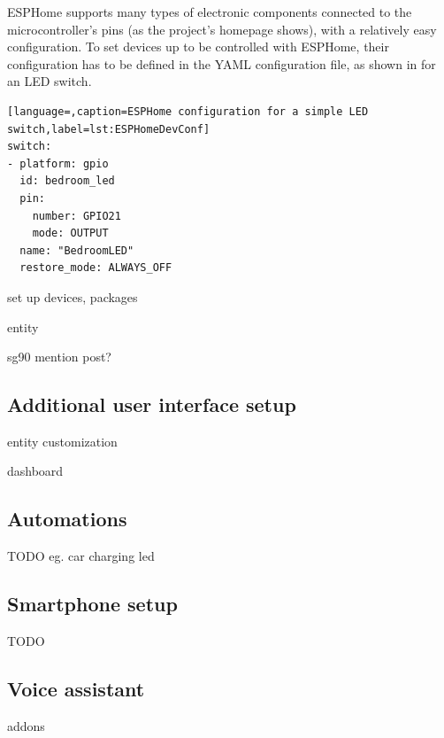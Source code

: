 ESPHome supports many types of electronic components connected to the microcontroller's pins (as the project's homepage shows), with a relatively easy configuration. \cite{ESPHomeHomepage} To set devices up to be controlled with ESPHome, their configuration has to be defined in the YAML configuration file, as shown in  for an LED switch.

\begin{lstlisting}[language=,caption=ESPHome configuration for a simple LED switch,label=lst:ESPHomeDevConf]
switch:
- platform: gpio
  id: bedroom_led
  pin:
    number: GPIO21
    mode: OUTPUT
  name: "BedroomLED"
  restore_mode: ALWAYS_OFF
\end{lstlisting}

set up devices, packages

entity

sg90 mention post?

\subsection{Additional user interface setup}

entity customization

dashboard

\subsection{Automations}

TODO eg. car charging led

\subsection{Smartphone setup}

TODO

\subsection{Voice assistant}

addons
